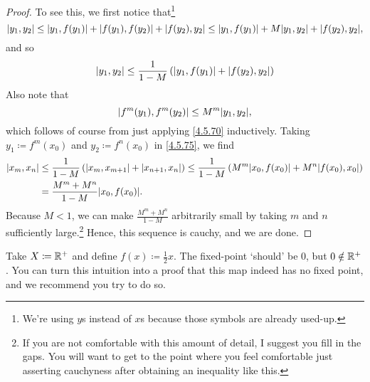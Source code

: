 \begin{thm}
\begin{proof}
To see this, we first notice that\footnote{We're using $y$s instead of $x$s because those symbols are already used-up.}
\begin{equation}
\metric[y_1][y_2]\leq \metric[y_1][f(y_1)]+\metric[f(y_1)][f(y_2)]+\metric[f(y_2)][y_2]\leq \metric[y_1][f(y_1)]+M\metric[y_1][y_2]+\metric[f(y_2)][y_2],
\end{equation}
and so
\begin{equation}\label{4.5.75}
\metric[y_1][y_2]\leq \frac{1}{1-M}\left( \metric[y_1][f(y_1)]+\metric[f(y_2)][y_2]\right) 
\end{equation}
Also note that
\begin{equation}
\metric[f^m(y_1)][f^m(y_2)]\leq M^m\metric[y_1][y_2],
\end{equation}
which follows of course from just applying \eqref{4.5.70} inductively.  Taking $y_1\coloneqq f^m(x_0)$ and $y_2\coloneqq f^n(x_0)$ in \eqref{4.5.75}, we find
\begin{equation}
\begin{split}
\metric[x_m][x_n] & \leq \frac{1}{1-M}\left( \metric[x_m][x_{m+1}]+\metric[x_{n+1}][x_n]\right) \leq \frac{1}{1-M}\left( M^m\metric[x_0][f(x_0)]+M^n\metric[f(x_0)][x_0]\right) \\
& =\frac{M^m+M^n}{1-M}\metric[x_0][f(x_0)].
\end{split}
\end{equation}
Because $M<1$, we can make $\frac{M^m+M^n}{1-M}$ arbitrarily small by taking $m$ and $n$ sufficiently large.\footnote{If you are not comfortable with this amount of detail, I suggest you fill in the gaps.  You will want to get to the point where you feel comfortable just asserting cauchyness after obtaining an inequality like this.}  Hence, this sequence is cauchy, and we are done.
\end{proof}
\end{thm}
\begin{exm}
Take $X\coloneqq \mathbb{R} ^+$ and define $f(x)\coloneqq \frac{1}{2}x$.  The fixed-point `should' be $0$, but $0\notin \mathbb{R} ^+$.  You can turn this intuition into a proof that this map indeed has no fixed point, and we recommend you try to do so.
\end{exm}